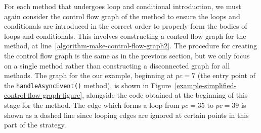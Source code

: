 For each method that undergoes loop and conditional introduction, we
must again consider the control flow graph of the method to ensure the
loops and conditionals are introduced in the correct order to properly
form the bodies of loops and conditionals.
This involves constructing a control flow graph for the method, at
line~\ref{algorithm-make-control-flow-graph2}.
The procedure for creating the control flow graph is the same as in
the previous section, but we only focus on a single method rather than
constructing a disconnected graph for all methods.
The graph for the our example, beginning at $pc=7$ (the entry point of
the \texttt{handleAsyncEvent()} method), is shown in
Figure~\ref{example-simplified-control-flow-graph-figure}, alongside
the \Circus{} code obtained at the beginning of this stage for the
method.
The edge which forms a loop from $pc=35$ to $pc=39$ is shown as a
dashed line since looping edges are ignored at certain points in this
part of the strategy.
